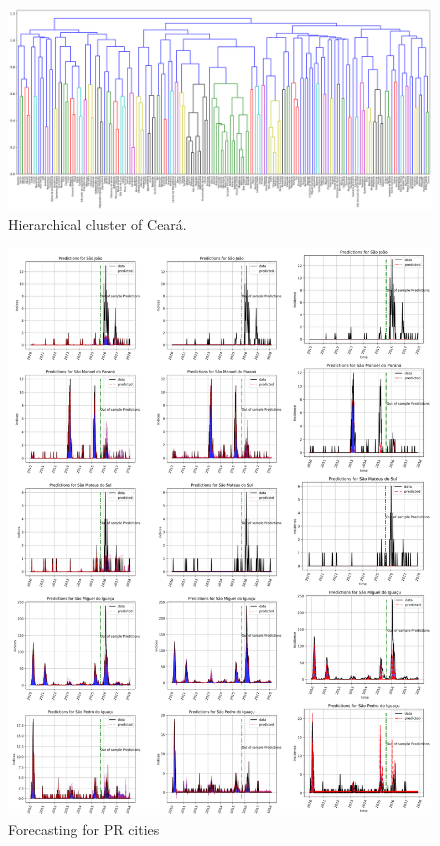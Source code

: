 \documentclass[12pt]{report}
\begin{document}
\begin{figure}[h!]
 \centering
 \includegraphics[width=\textwidth]{clusterCE_06.png}
 \caption{Hierarchical cluster of Ceará.}
 \label{fig:cluster_ce}
\end{figure}

%  
  \begin{figure}[!ht] 
 \centering 
 \includegraphics[scale=0.06]{PR_360.png} 
 \caption{Forecasting for PR cities } 
 \label{fig:PR_360} 
 \end{figure} 
 
\end{document}
